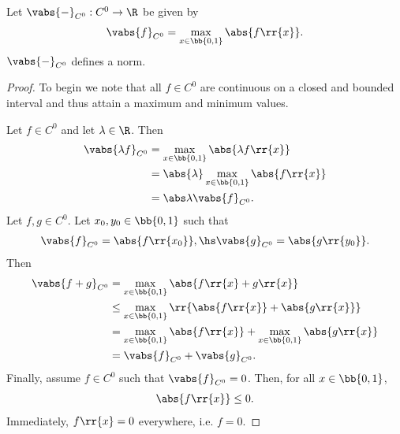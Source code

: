\documentclass{article}
\begin{document}
\begin{claim*}[6]
  Let $\vabs{-}_{C^0}:C^0\to \R$ be given by
  \begin{align*}
    \vabs{f}_{C^0}=\max_{x\in \bb{ 0,1 }}\abs{f \rr{ x }}.
  \end{align*}
  $\vabs{-}_{C^0}$ defines a norm.
  \begin{proof}
    To begin we note that all $f\in C^0$ are continuous on a closed and bounded interval
    and thus attain a maximum and minimum values.

    Let $f\in C^0$ and let $\lambda\in\R$. Then
    \begin{align*}
      \vabs{\lambda f}_{C^0} &= \max_{x\in \bb{ 0,1 }}\abs{\lambda f \rr{ x }} \\
                             &= \abs{\lambda} \max_{x\in \bb{ 0,1 }}\abs{f \rr{ x }} \\
                             &= \abs\lambda \vabs{f}_{C^0}.
    \end{align*}
    Let $f,g\in C^0$. Let $x_0,y_0\in \bb{ 0,1 }$ such that
    \begin{align*}
      \vabs{f}_{C^0} = \abs{f \rr{ x_0 }}, \hs \vabs{g}_{C^0} = \abs{g \rr{ y_0 }}.
    \end{align*}
    Then
    \begin{align*}
      \vabs{f + g}_{C^0} &= \max_{x\in \bb{ 0,1 }} \abs{ f \rr{ x } + g \rr{ x } } \\
                         &\leq \max_{x\in \bb{ 0,1 }} \rr{ \abs{f \rr{ x }} + \abs{g \rr{ x } }} \\
                         &= \max_{x\in \bb{ 0,1 }} \abs{ f \rr{ x } } + \max_{x\in \bb{ 0,1 }} \abs{ g \rr{ x } } \\
                         &= \vabs{f}_{C^0} + \vabs{g}_{C^0}.
    \end{align*}
    Finally, assume $f\in C^0$ such that $\vabs{f}_{C^0}=0$. Then, for all $x\in \bb{ 0,1 }$,
    \begin{align*}
      \abs{f \rr{ x }} \leq 0.
    \end{align*}
    Immediately, $f \rr{ x }=0$ everywhere, i.e. $f=0$.
  \end{proof}
\end{claim*}
\end{document}
